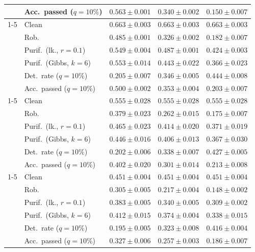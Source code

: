 \begin{table}[htbp]
\begin{tabular}{@{}llrrr@{}}
     & Acc.\ passed ($q{=}10\%$) & $0.563 \pm 0.001$ & $0.340 \pm 0.002$ & $0.150 \pm 0.007$ \\
    \cmidrule(lr){1-5}
    \multirow{6}{*}{$\alpha{=}0.2$} & Clean & $0.663 \pm 0.003$ & $0.663 \pm 0.003$ & $0.663 \pm 0.003$ \\
     & Rob. & $0.485 \pm 0.001$ & $0.326 \pm 0.002$ & $0.182 \pm 0.007$ \\
     & Purif.\ (lk., $r{=}0.1$) & $0.549 \pm 0.004$ & $0.487 \pm 0.001$ & $0.424 \pm 0.003$ \\
     & Purif.\ (Gibbs, $k{=}6$) & $0.553 \pm 0.014$ & $0.443 \pm 0.022$ & $0.366 \pm 0.023$ \\
     & Det.\ rate ($q{=}10\%$) & $0.205 \pm 0.007$ & $0.346 \pm 0.005$ & $0.444 \pm 0.008$ \\
     & Acc.\ passed ($q{=}10\%$) & $0.500 \pm 0.002$ & $0.353 \pm 0.004$ & $0.203 \pm 0.007$ \\
    \cmidrule(lr){1-5}
    \multirow{6}{*}{$\alpha{=}0.5$} & Clean & $0.555 \pm 0.028$ & $0.555 \pm 0.028$ & $0.555 \pm 0.028$ \\
     & Rob. & $0.379 \pm 0.023$ & $0.262 \pm 0.015$ & $0.175 \pm 0.007$ \\
     & Purif.\ (lk., $r{=}0.1$) & $0.465 \pm 0.023$ & $0.414 \pm 0.020$ & $0.371 \pm 0.019$ \\
     & Purif.\ (Gibbs, $k{=}6$) & $0.446 \pm 0.016$ & $0.406 \pm 0.013$ & $0.367 \pm 0.030$ \\
     & Det.\ rate ($q{=}10\%$) & $0.202 \pm 0.006$ & $0.338 \pm 0.007$ & $0.427 \pm 0.005$ \\
     & Acc.\ passed ($q{=}10\%$) & $0.402 \pm 0.020$ & $0.301 \pm 0.014$ & $0.213 \pm 0.008$ \\
    \cmidrule(lr){1-5}
    \multirow{6}{*}{$\alpha{=}1$} & Clean & $0.451 \pm 0.004$ & $0.451 \pm 0.004$ & $0.451 \pm 0.004$ \\
     & Rob. & $0.305 \pm 0.005$ & $0.217 \pm 0.004$ & $0.148 \pm 0.002$ \\
     & Purif.\ (lk., $r{=}0.1$) & $0.383 \pm 0.005$ & $0.340 \pm 0.005$ & $0.309 \pm 0.002$ \\
     & Purif.\ (Gibbs, $k{=}6$) & $0.412 \pm 0.015$ & $0.374 \pm 0.004$ & $0.338 \pm 0.015$ \\
     & Det.\ rate ($q{=}10\%$) & $0.195 \pm 0.005$ & $0.323 \pm 0.008$ & $0.416 \pm 0.004$ \\
     & Acc.\ passed ($q{=}10\%$) & $0.327 \pm 0.006$ & $0.257 \pm 0.003$ & $0.186 \pm 0.007$ \\

\end{tabular}
\end{table}
